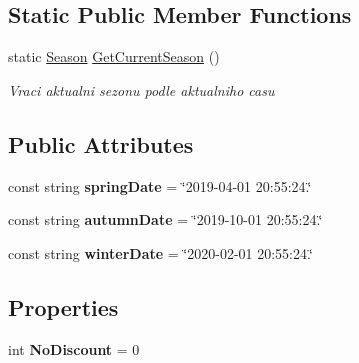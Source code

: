\subsection*{Static Public Member Functions}
\begin{DoxyCompactItemize}
\item 
static \mbox{\hyperlink{class_eshop_1_1_season}{Season}} \mbox{\hyperlink{class_eshop_1_1_season_a3ebc704b1930bb304863e1c28058cbfa}{Get\+Current\+Season}} ()
\begin{DoxyCompactList}\small\item\em Vraci aktualni sezonu podle aktualniho casu \end{DoxyCompactList}\end{DoxyCompactItemize}
\subsection*{Public Attributes}
\begin{DoxyCompactItemize}
\item 
\mbox{\label{class_eshop_1_1_season_af6e526a3052911a60660b66bbff092d4}} 
const string {\bfseries spring\+Date} = \char`\"{}2019-\/04-\/01 20\+:55\+:24.\char`\"{}
\item 
\mbox{\label{class_eshop_1_1_season_a404e503d9c00c193eaf3a2cb470ce823}} 
const string {\bfseries autumn\+Date} = \char`\"{}2019-\/10-\/01 20\+:55\+:24.\char`\"{}
\item 
\mbox{\label{class_eshop_1_1_season_a7f4cd8477f9a9bfe46dc75c98ef90a60}} 
const string {\bfseries winter\+Date} = \char`\"{}2020-\/02-\/01 20\+:55\+:24.\char`\"{}
\end{DoxyCompactItemize}
\subsection*{Properties}
\begin{DoxyCompactItemize}
\item 
\mbox{\label{class_eshop_1_1_season_a56ba39054b3add35b933b24921dc23dc}} 
int {\bfseries No\+Discount} = 0
\end{DoxyCompactItemize}


